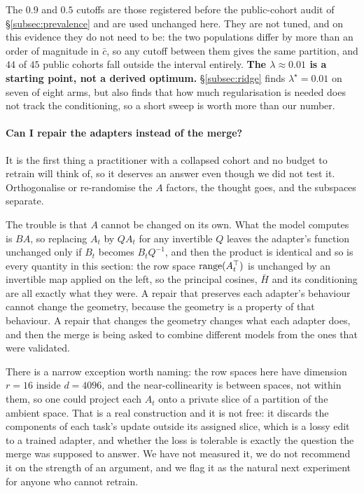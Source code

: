 The $0.9$ and $0.5$ cutoffs are those registered before the public-cohort
audit of \S\ref{subsec:prevalence} and are used unchanged here. They are not
tuned, and on this evidence they do not need to be: the two populations differ
by more than an order of magnitude in $\bar c$, so any cutoff between them
gives the same partition, and $44$ of $45$ public cohorts fall outside the
interval entirely. \textbf{The $\lambda \approx 0.01$ is a starting point, not
a derived optimum.} \S\ref{subsec:ridge} finds $\lambda^\star = 0.01$ on seven
of eight arms, but also finds that how much regularisation is needed does not
track the conditioning, so a short sweep is worth more than our number.

\paragraph{Can I repair the adapters instead of the merge?} It is the first
thing a practitioner with a collapsed cohort and no budget to retrain will
think of, so it deserves an answer even though we did not test it. Orthogonalise
or re-randomise the $A$ factors, the thought goes, and the subspaces separate.

The trouble is that $A$ cannot be changed on its own. What the model computes
is $BA$, so replacing $A_t$ by $Q A_t$ for any invertible $Q$ leaves the
adapter's function unchanged only if $B_t$ becomes $B_t Q^{-1}$, and then the
product is identical and so is every quantity in this section: the row space
$\operatorname{range}(A_t^\top)$ is unchanged by an invertible map applied on the left, so
the principal cosines, $\bar H$ and its conditioning are all exactly what they
were. A repair that preserves each adapter's behaviour cannot change the
geometry, because the geometry is a property of that behaviour. A repair that
changes the geometry changes what each adapter does, and then the merge is
being asked to combine different models from the ones that were validated.

There is a narrow exception worth naming: the row spaces here have dimension
$r = 16$ inside $d = 4096$, and the near-collinearity is between spaces, not
within them, so one could project each $A_t$ onto a private slice of a
partition of the ambient space. That is a real construction and it is not free:
it discards the components of each task's update outside its assigned slice,
which is a lossy edit to a trained adapter, and whether the loss is tolerable
is exactly the question the merge was supposed to answer. We have not measured
it, we do not recommend it on the strength of an argument, and we flag it as
the natural next experiment for anyone who cannot retrain.

